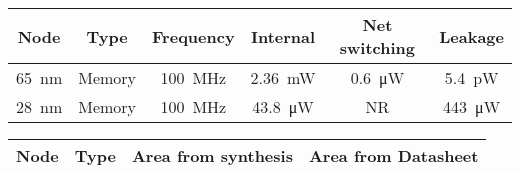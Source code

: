 \begin{table}[h]
\begin{minipage}{1\textwidth}
\begin{minipage}{0.65\textwidth}
\begin{adjustbox}{width=1\textwidth}
\begin{tabular}{ |c|c|c|c|c|c|  }
          Node  & Type      & Frequency                              & Internal                & Net switching           & Leakage                 \\
              \hline
          \SI{65}{\nano\meter}  & Memory    & \SI[per-mode=symbol]{100}{\mega\hertz}  & \SI{2.36}{\milli\watt}  & \SI{0.6}{\micro\watt}  & \SI{5.4}{\pico\watt}    \\   %
          \SI{28}{\nano\meter}  & Memory    & \SI[per-mode=symbol]{100}{\mega\hertz}  & \SI{43.8}{\micro\watt}  & NR                     & \SI{443}{\micro\watt}   \\   %
              \hline
            \end{tabular}
        \end{adjustbox}
      \label{tab:Example design with memory synthesis power}
    \end{minipage}
    \begin{minipage}{0.65\textwidth}
        \vspace{5mm}
        \begin{adjustbox}{width=1\textwidth}
            \footnotesize
            \begin{tabular}{ |c|c|c|c|  }
              \hline
          Node  & Type      & Area from synthesis                                 & Area from Datasheet                                \\
              \hline

\end{tabular}
\end{adjustbox}
\end{minipage}
\end{minipage}
\end{table}
